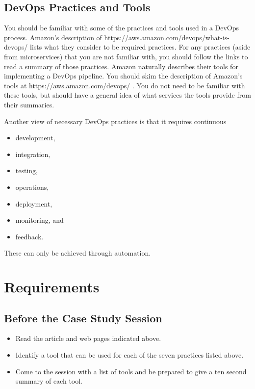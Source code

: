 \documentclass{csse4400}
\begin{document}
\subsection{DevOps Practices and Tools}\label{sec:DevOps-Practices}
You should be familiar with some of the practices and tools used in a DevOps process.
Amazon's description of 
{https://aws.amazon.com/devops/what-is-devops/} \cite{AWS-DevOps} lists what they consider to be required practices.
For any practices (aside from microservices) that you are not familiar with, you should follow the links to read a summary of those practices.
Amazon naturally describes their tools for implementing a DevOps pipeline.
You should skim the description of Amazon's tools at 
{https://aws.amazon.com/devops/} \cite{AWS-DevOps-Tools}.
You do not need to be familiar with these tools, but should have a general idea of what services the tools provide from their summaries.

\newpage
\noindent
Another view of necessary DevOps practices is that it requires continuous
\begin{itemize}[nosep]
    \item development,
    \item integration,
    \item testing,
    \item operations,
    \item deployment,
    \item monitoring, and
    \item feedback.
\end{itemize}
These can only be achieved through automation.



\section{Requirements}

\subsection*{Before the Case Study Session}
\begin{itemize}
    \item Read the article and web pages indicated above.
    \item Identify a tool that can be used for each of the seven practices listed above.
    \item Come to the session with a list of tools and be prepared to give a ten second summary of each tool.
\end{itemize}
\end{document}
